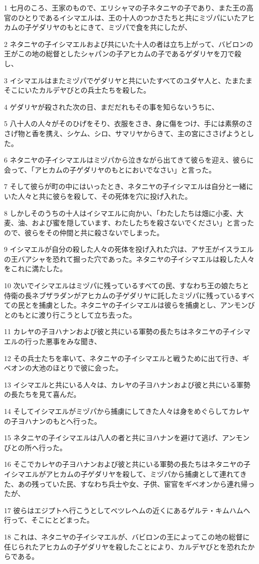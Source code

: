 \par 1 七月のころ、王家のもので、エリシャマの子ネタニヤの子であり、また王の高官のひとりであるイシマエルは、王の十人のつかさたちと共にミヅパにいたアヒカムの子ゲダリヤのもとにきて、ミヅパで食を共にしたが、
\par 2 ネタニヤの子イシマエルおよび共にいた十人の者は立ち上がって、バビロンの王がこの地の総督としたシャパンの子アヒカムの子であるゲダリヤを刀で殺し、
\par 3 イシマエルはまたミヅパでゲダリヤと共にいたすべてのユダヤ人と、たまたまそこにいたカルデヤびとの兵士たちを殺した。
\par 4 ゲダリヤが殺された次の日、まだだれもその事を知らないうちに、
\par 5 八十人の人々がそのひげをそり、衣服をさき、身に傷をつけ、手には素祭のささげ物と香を携え、シケム、シロ、サマリヤからきて、主の宮にささげようとした。
\par 6 ネタニヤの子イシマエルはミヅパから泣きながら出てきて彼らを迎え、彼らに会って、「アヒカムの子ゲダリヤのもとにおいでなさい」と言った。
\par 7 そして彼らが町の中にはいったとき、ネタニヤの子イシマエルは自分と一緒にいた人々と共に彼らを殺して、その死体を穴に投げ入れた。
\par 8 しかしそのうちの十人はイシマエルに向かい、「わたしたちは畑に小麦、大麦、油、および蜜を隠しています、わたしたちを殺さないでください」と言ったので、彼らをその仲間と共に殺さないでしまった。
\par 9 イシマエルが自分の殺した人々の死体を投げ入れた穴は、アサ王がイスラエルの王バアシャを恐れて掘った穴であった。ネタニヤの子イシマエルは殺した人々をこれに満たした。
\par 10 次いでイシマエルはミヅパに残っているすべての民、すなわち王の娘たちと侍衛の長ネブザラダンがアヒカムの子ゲダリヤに託したミヅパに残っているすべての民とを捕虜とした。ネタニヤの子イシマエルは彼らを捕虜とし、アンモンびとのもとに渡り行こうとして立ち去った。
\par 11 カレヤの子ヨハナンおよび彼と共にいる軍勢の長たちはネタニヤの子イシマエルの行った悪事をみな聞き、
\par 12 その兵士たちを率いて、ネタニヤの子イシマエルと戦うために出て行き、ギベオンの大池のほとりで彼に会った。
\par 13 イシマエルと共にいる人々は、カレヤの子ヨハナンおよび彼と共にいる軍勢の長たちを見て喜んだ。
\par 14 そしてイシマエルがミヅパから捕虜にしてきた人々は身をめぐらしてカレヤの子ヨハナンのもとへ行った。
\par 15 ネタニヤの子イシマエルは八人の者と共にヨハナンを避けて逃げ、アンモンびとの所へ行った。
\par 16 そこでカレヤの子ヨハナンおよび彼と共にいる軍勢の長たちはネタニヤの子イシマエルがアヒカムの子ゲダリヤを殺して、ミヅパから捕虜として連れてきた、あの残っていた民、すなわち兵士や女、子供、宦官をギベオンから連れ帰ったが、
\par 17 彼らはエジプトへ行こうとしてベツレヘムの近くにあるゲルテ・キムハムへ行って、そこにとどまった。
\par 18 これは、ネタニヤの子イシマエルが、バビロンの王によってこの地の総督に任じられたアヒカムの子ゲダリヤを殺したことにより、カルデヤびとを恐れたからである。

